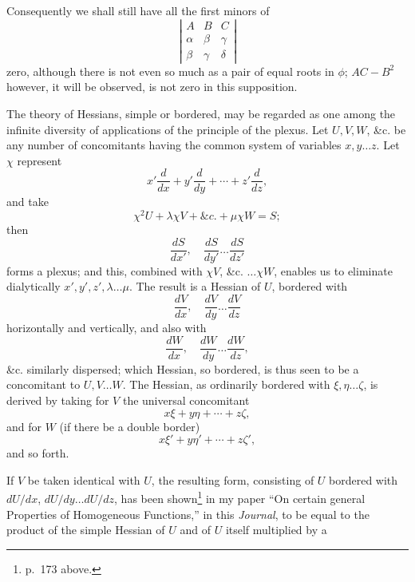 \documentclass[11pt]{article}
\newcommand{\sourcepage}[1]{\marginpar{\scriptsize p.~#1}}
\begin{document}
\sourcepage{350}
Consequently we shall still have all the first minors of
\[
\left|\begin{array}{ccc}
A&B&C\\
\alpha&\beta&\gamma\\
\beta&\gamma&\delta
\end{array}\right|
\]
zero, although there is not even so much as a pair of equal roots in $\phi$; $AC-B^2$ however, it will be observed, is not zero in this supposition.

The theory of Hessians, simple or bordered, may be regarded as one among the infinite diversity of applications of the principle of the plexus. Let $U,V,W$, \&c. be any number of concomitants having the common system of variables $x,y\ldots z$. Let $\chi$ represent
\[
x'\frac{d}{dx}+y'\frac{d}{dy}+\cdots+z'\frac{d}{dz},
\]
and take
\[
\chi^2U+\lambda\chi V+\&c.+\mu\chi W=S;
\]
then
\[
\frac{dS}{dx'},\quad \frac{dS}{dy'}\ldots \frac{dS}{dz'}
\]
forms a plexus; and this, combined with $\chi V$, \&c. $\ldots \chi W$, enables us to eliminate dialytically $x',y',z',\lambda\ldots\mu$. The result is a Hessian of $U$, bordered with
\[
\frac{dV}{dx},\quad \frac{dV}{dy}\ldots \frac{dV}{dz}
\]
horizontally and vertically, and also with
\[
\frac{dW}{dx},\quad \frac{dW}{dy}\ldots \frac{dW}{dz},
\]
\&c. similarly dispersed; which Hessian, so bordered, is thus seen to be a concomitant to $U,V\ldots W$. The Hessian, as ordinarily bordered with $\xi,\eta\ldots\zeta$, is derived by taking for $V$ the universal concomitant
\[
x\xi+y\eta+\cdots+z\zeta,
\]
and for $W$ (if there be a double border)
\[
x\xi'+y\eta'+\cdots+z\zeta',
\]
and so forth.

If $V$ be taken identical with $U$, the resulting form, consisting of $U$ bordered with $dU/dx$, $dU/dy\ldots dU/dz$, has been shown\footnote{p.~173 above.} in my paper ``On certain general Properties of Homogeneous Functions,'' in this \emph{Journal}, to be equal to the product of the simple Hessian of $U$ and of $U$ itself multiplied by a
\end{document}
